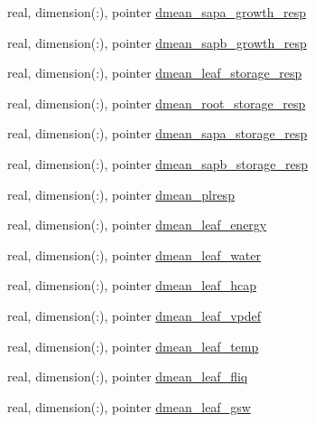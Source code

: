 \begin{DoxyCompactItemize}
real, dimension(\+:), pointer \hyperlink{structed__state__vars_1_1patchtype_a3621bb67a94ae40ce8ef988662d4e4dd}{dmean\+\_\+sapa\+\_\+growth\+\_\+resp}
\item 
real, dimension(\+:), pointer \hyperlink{structed__state__vars_1_1patchtype_a3ae406cade9e59ac386044d7bb4b6536}{dmean\+\_\+sapb\+\_\+growth\+\_\+resp}
\item 
real, dimension(\+:), pointer \hyperlink{structed__state__vars_1_1patchtype_aabe2cd4a4cf9b17053dcfb7cb6519796}{dmean\+\_\+leaf\+\_\+storage\+\_\+resp}
\item 
real, dimension(\+:), pointer \hyperlink{structed__state__vars_1_1patchtype_ad8060f4810a09b29db19f8c694623767}{dmean\+\_\+root\+\_\+storage\+\_\+resp}
\item 
real, dimension(\+:), pointer \hyperlink{structed__state__vars_1_1patchtype_a273a330481bccb481835f42f0abca25c}{dmean\+\_\+sapa\+\_\+storage\+\_\+resp}
\item 
real, dimension(\+:), pointer \hyperlink{structed__state__vars_1_1patchtype_ac87f3cebeec47f97d1678caa58427878}{dmean\+\_\+sapb\+\_\+storage\+\_\+resp}
\item 
real, dimension(\+:), pointer \hyperlink{structed__state__vars_1_1patchtype_a3edb3bdaaa41144178fd572d77a9278f}{dmean\+\_\+plresp}
\item 
real, dimension(\+:), pointer \hyperlink{structed__state__vars_1_1patchtype_a40ae3ff87a300b28800f179777c3a842}{dmean\+\_\+leaf\+\_\+energy}
\item 
real, dimension(\+:), pointer \hyperlink{structed__state__vars_1_1patchtype_a1c0580c9ce63ce00ea28f54a09f5bb9d}{dmean\+\_\+leaf\+\_\+water}
\item 
real, dimension(\+:), pointer \hyperlink{structed__state__vars_1_1patchtype_af0785e3b284236e5cd4469b554d0d0bb}{dmean\+\_\+leaf\+\_\+hcap}
\item 
real, dimension(\+:), pointer \hyperlink{structed__state__vars_1_1patchtype_a08851b5fe8f327b94e60c1b96dcccadd}{dmean\+\_\+leaf\+\_\+vpdef}
\item 
real, dimension(\+:), pointer \hyperlink{structed__state__vars_1_1patchtype_a83c5d201611e72bb682140d91d26b7fb}{dmean\+\_\+leaf\+\_\+temp}
\item 
real, dimension(\+:), pointer \hyperlink{structed__state__vars_1_1patchtype_ac9e509fc5ac100cd6fd9602f65bbd26b}{dmean\+\_\+leaf\+\_\+fliq}
\item 
real, dimension(\+:), pointer \hyperlink{structed__state__vars_1_1patchtype_aa5174c50c03ac5925ed1450673a30b96}{dmean\+\_\+leaf\+\_\+gsw}

\end{DoxyCompactItemize}
